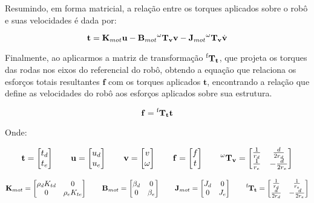 Resumindo, em forma matricial, 
a relação entre os torques aplicados sobre o robô
e suas velocidades é dada por:

\begin{equation}
\mathbf{t}
=
\mathbf{K}_{mot} \mathbf{u}
-
\mathbf{B}_{mot} \mathbf{\prescript{\omega}{}{T_v}} \mathbf{v}
-
\mathbf{J}_{mot} \mathbf{\prescript{\omega}{}{T_v}} \dot{\mathbf{v}}
\label{eq:force_torque}
\end{equation}

Finalmente, ao aplicarmos a matriz de transformação $\mathbf{\prescript{\text{f}}{}{T_t}}$, 
que projeta os torques das rodas nos eixos do referencial do robô, obtendo
 a equação que relaciona os esforços totais resultantes 
$\mathbf{f}$ com os torques aplicados $\mathbf{t}$, 
encontrando a relação que define as velocidades do robô aos esforços aplicados sobre sua estrutura.

\begin{equation}
\mathbf{f}
=
\mathbf{\prescript{\text{f}}{}{T_t}} \mathbf{t}
\end{equation}

Onde:

\[
\mathbf{t} =
\begin{bmatrix}
t_d \\
t_e
\end{bmatrix}
\qquad
\mathbf{u} =
\begin{bmatrix}
u_d \\
u_e
\end{bmatrix}
\qquad
\mathbf{v} =
\begin{bmatrix}
v \\
\omega
\end{bmatrix}
\qquad
\mathbf{f} =
\begin{bmatrix}
f \\
t
\end{bmatrix}
\qquad
\mathbf{\prescript{\omega}{}{T_v}} =
\begin{bmatrix}
\frac{1}{r_d} & \frac{d}{2r_d} \\
\frac{1}{r_e} & -\frac{d}{2r_e}
\end{bmatrix}
\]

\[
\mathbf{K}_{mot} =
\begin{bmatrix}
\rho_d K_{t d} & 0 \\
0 & \rho_e K_{t e}
\end{bmatrix}
\qquad
\mathbf{B}_{mot} =
\begin{bmatrix}
\beta_d & 0 \\
0 & \beta_e
\end{bmatrix}
\qquad
\mathbf{J}_{mot} =
\begin{bmatrix}
J_d & 0 \\
0 & J_e
\end{bmatrix}
\qquad
\mathbf{\prescript{\text{f}}{}{T_t}} =
\begin{bmatrix}
\frac{1}{r_d} & \frac{1}{r_e} \\
\frac{d}{2r_d} & -\frac{d}{2r_e}
\end{bmatrix}
\]


